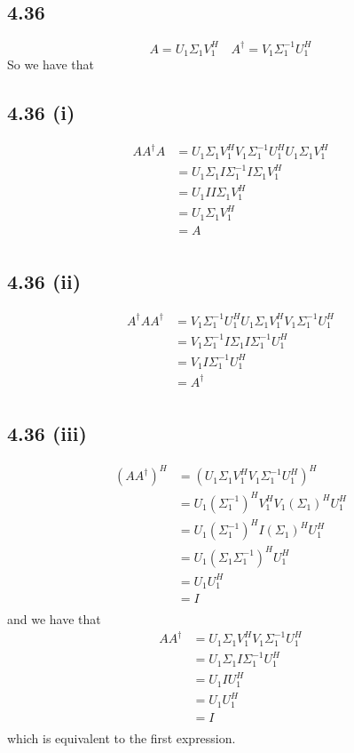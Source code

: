 \documentclass[letterpaper,12pt]{article}
\theoremstyle{definition}
\begin{document}
\subsection*{4.36}
\[ A = U_1 \Sigma_1 V_1^H \quad  A^\dagger = V_1 \Sigma^{-1}_1 U_1^H\]
So we have that
\subsection*{4.36 (i)}
\begin{align*}
AA^\dagger A&=  U_1 \Sigma_1 V_1^H   V_1 \Sigma^{-1}_1 U_1^H U_1 \Sigma_1 V_1^H\\
&=  U_1 \Sigma_1I \Sigma^{-1}_1 I \Sigma_1 V_1^H\\
&=  U_1 I I \Sigma_1 V_1^H\\
&=  U_1 \Sigma_1 V_1^H\\
&=  A\\
\end{align*}



\subsection*{4.36 (ii)}
\begin{align*}
    A^\dagger AA^\dagger&=  V_1 \Sigma^{-1}_1 U_1^H   U_1 \Sigma_1 V_1^H  V_1 \Sigma^{-1}_1 U_1^H\\
&=  V_1 \Sigma^{-1}_1I \Sigma_1 I \Sigma^{-1}_1 U_1^H\\
&=  V_1 I \Sigma^{-1}_1 U_1^H\\
&=  A^\dagger\\
\end{align*}



\subsection*{4.36 (iii)}
\begin{align*}
    (AA^\dagger)^H &= (U_1 \Sigma_1 V_1^H   V_1 \Sigma^{-1}_1 U_1^H)^H\\
&= U_1 (\Sigma^{-1}_1)^H V_1^H V_1  (\Sigma_1)^H       U_1^H\\
&= U_1 (\Sigma^{-1}_1)^H I  (\Sigma_1)^H       U_1^H\\
&= U_1 (\Sigma_1 \Sigma^{-1}_1)^H       U_1^H\\
&= U_1       U_1^H\\
&= I\\
\end{align*}
and we have that
\begin{align*}
    AA^\dagger &=  U_1 \Sigma_1 V_1^H V_1 \Sigma^{-1}_1 U_1^H  \\
&=  U_1 \Sigma_1 I \Sigma^{-1}_1 U_1^H  \\
&=  U_1 I U_1^H  \\
&=  U_1 U_1^H  \\
&=  I  \\
\end{align*}
which is equivalent to the first expression.
\end{document}
